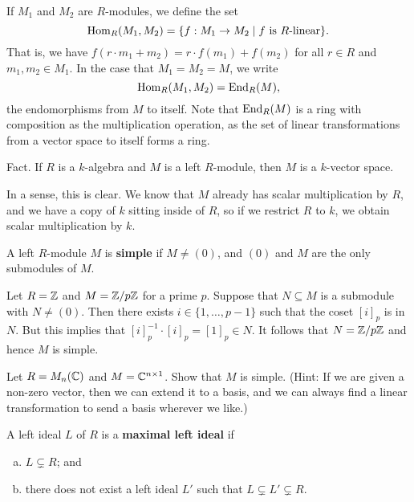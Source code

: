 \begin{remark}
If $M_1$ and $M_2$ are $R$-modules, we define the set 
\[ \operatorname{Hom}_R(M_1, M_2) = \{f : M_1 \to M_2 \mid f \text{ is $R$-linear}\}. \]
That is, we have $f(r \cdot m_1 + m_2) = r \cdot f(m_1) + f(m_2)$ for all $r \in R$ and $m_1, m_2 \in M_1$. 
In the case that $M_1 = M_2 = M$, we write 
\[ \operatorname{Hom}_R(M_1, M_2) = \operatorname{End}_R(M), \]
the endomorphisms from $M$ to itself. Note that $\operatorname{End}_R(M)$ is a ring with composition as 
the multiplication operation, as the set of linear transformations from a vector space to itself 
forms a ring. 
\end{remark}

{\sc Fact.} If $R$ is a $k$-algebra and $M$ is a left $R$-module, then $M$ is a $k$-vector space. 

In a sense, this is clear. We know that $M$ already has scalar multiplication by $R$, and we have a 
copy of $k$ sitting inside of $R$, so if we restrict $R$ to $k$, we obtain scalar multiplication by $k$.

\begin{defn}
A left $R$-module $M$ is {\bf simple} if $M \neq (0)$, and $(0)$ and $M$ are the only submodules of $M$.
\end{defn}

\begin{exmp}
Let $R = \mathbb{Z}$ and $M = \mathbb{Z}/p\mathbb{Z}$ for a prime $p$. Suppose that $N \subseteq M$ is a submodule with 
$N \neq (0)$. Then there exists $i \in \{1, \dots, p-1\}$ such that the coset $[i]_p$ is in $N$. 
But this implies that $[i]_p^{-1} \cdot [i]_p = [1]_p \in N$. It follows that $N = \mathbb{Z}/p\mathbb{Z}$ and hence 
$M$ is simple. 
\end{exmp}

\begin{exercise}
Let $R = M_n(\mathbb{C})$ and $M = \mathbb{C}^{n\times 1}$. Show that $M$ is simple. (Hint: If we are given a 
non-zero vector, then we can extend it to a basis, and we can always find a linear transformation to 
send a basis wherever we like.)
\end{exercise}

\begin{defn}
A left ideal $L$ of $R$ is a {\bf maximal left ideal} if 
\begin{enumerate}[(a)]
    \item $L \subsetneq R$; and
    \item there does not exist a left ideal $L'$ such that $L \subsetneq L' \subsetneq R$. 
\end{enumerate} 
\end{defn}

